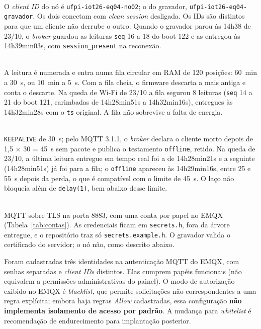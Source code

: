 \begin{description}[style=unboxed, leftmargin=0pt, font=\normalfont\bfseries]
  \item[1. Sessão persistente nos dois lados, com \emph{client ID} fixo.]\hfill\\
    O \emph{client ID} do nó é \texttt{ufpi-iot26-eq04-no02}; o do gravador, \texttt{ufpi-iot26-eq04-gravador}. Os dois conectam com \emph{clean session} desligada. Os IDs são distintos para que um cliente não derrube o outro. Quando o gravador parou às 14h38 de 23/10, o \emph{broker} guardou as leituras \texttt{seq} 16 a 18 do boot 122 e as entregou às 14h39min03s, com \texttt{session\_present} na reconexão.
  \item[2. O que o nó faz quando o \emph{broker} está fora de alcance.]\hfill\\
    A leitura é numerada e entra numa fila circular em RAM de 120 posições: 60~min a 30~s, ou 10~min a 5~s. Com a fila cheia, o firmware descarta a mais antiga e conta o descarte. Na queda de Wi-Fi de 23/10 a fila segurou 8 leituras (\texttt{seq} 14 a 21 do boot 121, carimbadas de 14h28min51s a 14h32min16s), entregues às 14h32min28s com o \texttt{ts} original. A fila não sobrevive a falta de energia.
  \item[3. \emph{Keepalive} e testamento.]\hfill\\
    \texttt{KEEPALIVE} de 30~s; pelo MQTT 3.1.1, o \emph{broker} declara o cliente morto depois de 1,5 $\times$ 30 = 45~s sem pacote e publica o testamento \texttt{offline}, retido. Na queda de 23/10, a última leitura entregue em tempo real foi a de 14h28min21s e a seguinte (14h28min51s) já foi para a fila; o \texttt{offline} apareceu às 14h29min16s, entre 25 e 55~s depois da perda, o que é compatível com o limite de 45~s. O laço não bloqueia além de \texttt{delay(1)}, bem abaixo desse limite.
  \item[4. Segurança mínima.]\hfill\\
    MQTT sobre TLS na porta 8883, com uma conta por papel no EMQX (Tabela~\ref{tab:contas}). As credenciais ficam em \texttt{secrets.h}, fora da árvore entregue, e o repositório traz só \texttt{secrets.example.h}. O gravador valida o certificado do servidor; o nó não, como descrito abaixo.
\end{description}
Foram cadastradas três identidades na autenticação MQTT do EMQX, com senhas separadas e \emph{client IDs} distintos. Elas cumprem papéis funcionais (não equivalem a permissões administrativas do painel). O modo de autorização exibido no EMQX é \emph{blacklist}, que permite solicitações não correspondentes a uma regra explícita; embora haja regras \emph{Allow} cadastradas, essa configuração \textbf{não implementa isolamento de acesso por padrão}. A mudança para \emph{whitelist} é recomendação de endurecimento para implantação posterior.
